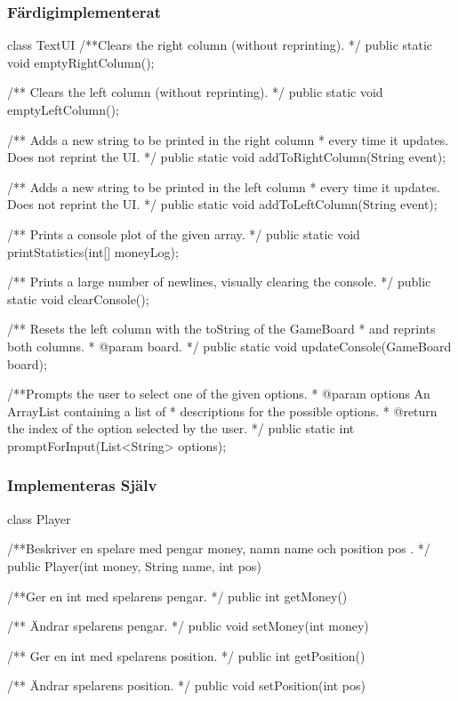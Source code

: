\subsubsection{Färdigimplementerat}
\begin{JavaSpec}{class TextUI}
     /**Clears the right column (without reprinting). */
    public static void emptyRightColumn();

    /** Clears the left column (without reprinting). */
    public static void emptyLeftColumn();

    /** Adds a new string to be printed in the right column
     * every time it updates. Does not reprint the UI. */
    public static void addToRightColumn(String event);

    /** Adds a new string to be printed in the left column
     * every time it updates. Does not reprint the UI. */
    public static void addToLeftColumn(String event);

    /** Prints a console plot of the given array. */
    public static void printStatistics(int[] moneyLog);

    /** Prints a large number of newlines, visually clearing the console. */
    public static void clearConsole();

    /** Resets the left column with the toString of the GameBoard
     * and reprints both columns.
     * @param board. 
     */
    public static void updateConsole(GameBoard board);

    /**Prompts the user to select one of the given options.
     * @param options An ArrayList containing a list of
     *          descriptions for the possible options.
     * @return the index of the option selected by the user.
     */
    public static int promptForInput(List<String> options);
\end{JavaSpec}

\subsubsection{Implementeras Själv}
\begin{JavaSpec}{class Player}

/**Beskriver en spelare med pengar money, namn name och position pos . */
public Player(int money, String name, int pos)

/**Ger en int med spelarens pengar. */
public int getMoney()

/** Ändrar spelarens pengar. */
public void setMoney(int money)

/** Ger en int med spelarens position. */
public int getPosition()

/** Ändrar spelarens position. */
public void setPosition(int pos)

\end{JavaSpec}

